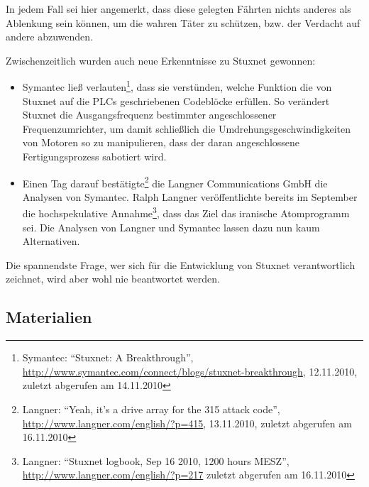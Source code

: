 In jedem Fall sei hier angemerkt, dass diese gelegten Fährten nichts
anderes als Ablenkung sein können, um die wahren Täter zu schützen,
bzw. der Verdacht auf andere abzuwenden.

Zwischenzeitlich wurden auch neue Erkenntnisse zu Stuxnet gewonnen:

\begin{itemize}
  \item Symantec ließ verlauten\footnote{Symantec: \enquote{Stuxnet: A
Breakthrough},
\url{http://www.symantec.com/connect/blogs/stuxnet-breakthrough},
12.11.2010, zuletzt abgerufen am 14.11.2010}, dass sie verstünden,
welche Funktion die von Stuxnet auf die PLCs geschriebenen Codeblöcke
erfüllen. So verändert Stuxnet die Ausgangsfrequenz bestimmter
angeschlossener Frequenzumrichter, um damit schließlich die
Umdrehungsgeschwindigkeiten von Motoren so zu manipulieren, dass der
daran angeschlossene Fertigungsprozess sabotiert wird.
  
  \item Einen Tag darauf bestätigte\footnote{Langner: \enquote{Yeah,
it's a drive array for the 315 attack code},
\url{http://www.langner.com/english/?p=415}, 13.11.2010, zuletzt
abgerufen am 16.11.2010} die Langner Communications GmbH die Analysen
von Symantec. Ralph Langner veröffentlichte bereits im September die
hochspekulative Annahme\footnote{Langner: \enquote{Stuxnet logbook,
Sep 16 2010, 1200 hours MESZ},
\url{http://www.langner.com/english/?p=217} zuletzt abgerufen am
16.11.2010}, dass das Ziel das iranische Atomprogramm sei. Die
Analysen von Langner und Symantec lassen dazu nun kaum Alternativen.
\end{itemize}

Die spannendste Frage, wer sich für die Entwicklung von Stuxnet
verantwortlich zeichnet, wird aber wohl nie beantwortet werden.

\subsection{Materialien}

